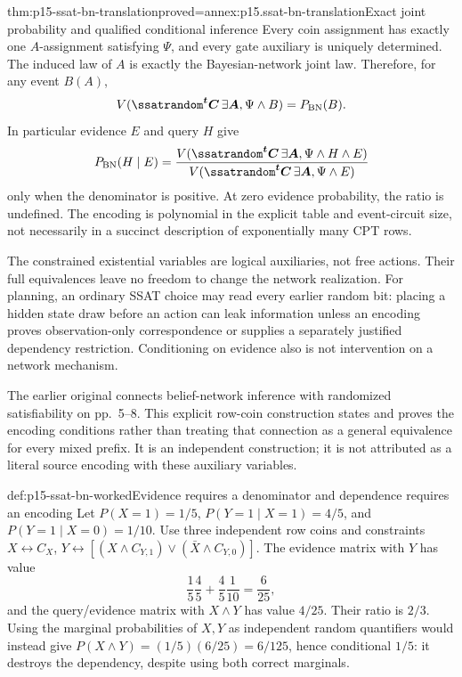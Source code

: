 \begin{hbtheorem}{thm:p15-ssat-bn-translation}{proved=annex:p15.ssat-bn-translation}{Exact joint probability and qualified conditional inference}
Every coin assignment has exactly one \(A\)-assignment satisfying
\(\Psi\), and every gate auxiliary is uniquely determined. The
induced law of \(A\) is exactly the Bayesian-network joint law.
Therefore, for any event \(B(A)\),
\[
 V(\ssatrandom^{\boldsymbol t}\boldsymbol C\,\exists\boldsymbol A,\Psi\land B)
      =P_{\mathrm{BN}}(B).
\]
In particular evidence \(E\) and query \(H\) give
\[
 P_{\mathrm{BN}}(H\mid E)
    =\frac{V(\ssatrandom^{\boldsymbol t}\boldsymbol C\,\exists\boldsymbol A,
                    \Psi\land H\land E)}
            {V(\ssatrandom^{\boldsymbol t}\boldsymbol C\,\exists\boldsymbol A,
                    \Psi\land E)}
\]
only when the denominator is positive. At zero evidence probability,
the ratio is undefined. The encoding is polynomial in the explicit
table and event-circuit size, not necessarily in a succinct description
of exponentially many CPT rows.
\end{hbtheorem}

The constrained existential variables are logical auxiliaries, not free
actions. Their full equivalences leave no freedom to change the network
realization. For planning, an ordinary SSAT choice may read every earlier
random bit: placing a hidden state draw before an action can leak
information unless an encoding proves observation-only correspondence
or supplies a separately justified dependency restriction. Conditioning
on evidence also is not intervention on a network mechanism.

The earlier original connects belief-network inference with randomized
satisfiability on pp.~5--8. This explicit row-coin construction states
and proves the encoding conditions rather than treating that connection
as a general equivalence for every mixed prefix. It is an independent
construction; it is not attributed as a literal source encoding with
these auxiliary variables.

\begin{hbexample}{def:p15-ssat-bn-worked}{Evidence requires a denominator and dependence requires an encoding}
Let \(P(X=1)=1/5\), \(P(Y=1\mid X=1)=4/5\), and
\(P(Y=1\mid X=0)=1/10\). Use three independent row coins and
constraints \(X\leftrightarrow C_X\),
\(Y\leftrightarrow[(X\land C_{Y,1})\lor(\bar X\land C_{Y,0})]\).
The evidence matrix with \(Y\) has value
\[
 \frac15\frac45+\frac45\frac1{10}=\frac6{25},
\]
and the query/evidence matrix with \(X\land Y\) has value
\(4/25\). Their ratio is \(2/3\). Using the marginal probabilities
of \(X,Y\) as independent random quantifiers would instead give
\(P(X\land Y)=(1/5)(6/25)=6/125\), hence conditional \(1/5\):
it destroys the dependency, despite using both correct marginals.
\end{hbexample}

